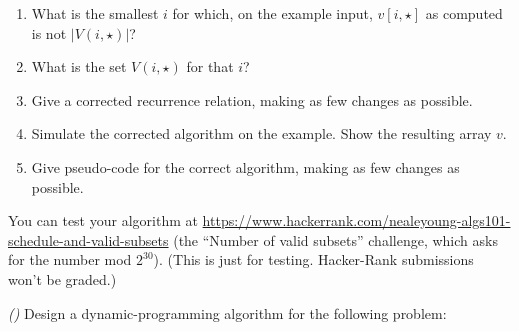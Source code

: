 \documentclass[11pt]{article}
\begin{document}
\begin{enumerate}[label=(\alph*)]

\item

  What is the smallest $i$ for which, on the example input, $v[i,\star]$
  as computed is not $|V(i, \star)|$?

\item
  
  What is the set $V(i,\star)$ for that $i$?

\item

  Give a corrected recurrence relation, making as few changes as possible.



\item

  Simulate the corrected algorithm on the example.
  Show the resulting array $v$.

\item

  Give pseudo-code for the correct algorithm, making as few changes as possible.

\end{enumerate}

You can test your algorithm at \url{https://www.hackerrank.com/nealeyoung-algs101-schedule-and-valid-subsets}
(the ``Number of valid subsets'' challenge, which asks for the number mod $2^{30}$).
(This is just for testing. Hacker-Rank submissions won't be graded.)

\newpage

\setlength{\ITEMHT}{1.9in}
{\injectEnumerate
}





\newpage

\small
\problem\emph{()}
Design a dynamic-programming algorithm for the following problem:
\end{document}
